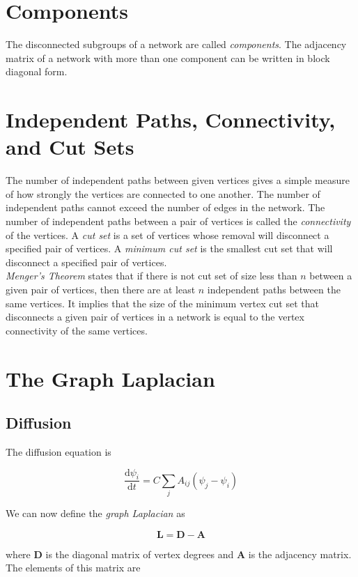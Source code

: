 \documentclass[12pt]{book}
\begin{document}
\section{Components}
The disconnected subgroups of a network are called \textit{components}.  The adjacency matrix of a network with more than one component can be written in block diagonal form.

\section{Independent Paths, Connectivity, and Cut Sets}
The number of independent paths between given vertices gives a simple measure of how strongly the vertices are connected to one another.  The number of independent paths cannot exceed the number of edges in the network.  The number of independent paths between a pair of vertices is called the \textit{connectivity} of the vertices.  A \textit{cut set} is a set of vertices whose removal will disconnect a specified pair of vertices.  A \textit{minimum cut set} is the smallest cut set that will disconnect a specified pair of vertices. \\

\textit{Menger's Theorem} states that if there is not cut set of size less than $n$ between a given pair of vertices, then there are at least $n$ independent paths between the same vertices.  It implies that the size of the minimum vertex cut set that disconnects a given pair of vertices in a network is equal to the vertex connectivity of the same vertices.

\section{The Graph Laplacian}
\subsection{Diffusion}
The diffusion equation is

\begin{equation}
\frac{\mathrm d\psi_i}{\mathrm dt} = C\sum_j A_{ij}\left(\psi_j - \psi_i\right)
\end{equation}

We can now define the \textit{graph Laplacian} as

\begin{equation}
\mathbf{L} = \mathbf{D} - \mathbf{A}
\end{equation}

where $\mathbf{D}$ is the diagonal matrix of vertex degrees and $\mathbf{A}$ is the adjacency matrix.  The elements of this matrix are
\end{document}
